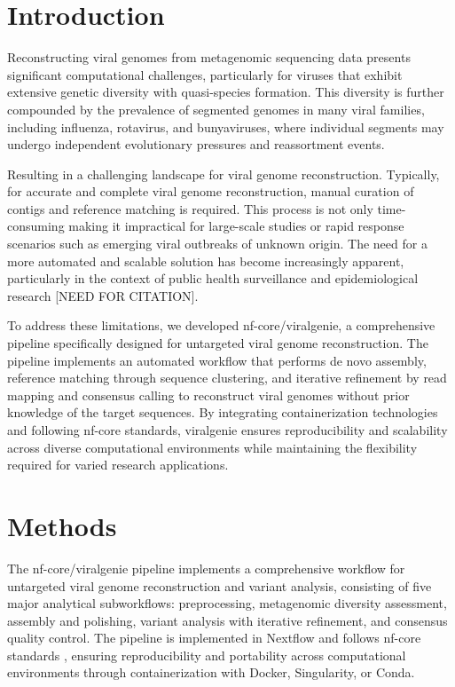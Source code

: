 \documentclass[unnumsec,webpdf,contemporary,large]{oup-authoring-template}%
\theoremstyle{thmstyleone}%
\theoremstyle{thmstyletwo}%
\theoremstyle{thmstylethree}%
\begin{document}
\section{Introduction}\label{sec1}

Reconstructing viral genomes from metagenomic sequencing data presents significant computational challenges, particularly for viruses that exhibit extensive genetic diversity with quasi-species formation. This diversity is further compounded by the prevalence of segmented genomes in many viral families, including influenza, rotavirus, and bunyaviruses, where individual segments may undergo independent evolutionary pressures and reassortment events.

Resulting in a challenging landscape for viral genome reconstruction. Typically, for accurate and complete viral genome reconstruction, manual curation of contigs and reference matching is required. This process is not only time-consuming making it impractical for large-scale studies or rapid response scenarios such as emerging viral outbreaks of unknown origin. The need for a more automated and scalable solution has become increasingly apparent, particularly in the context of public health surveillance and epidemiological research [NEED FOR CITATION].

To address these limitations, we developed nf-core/viralgenie, a comprehensive pipeline specifically designed for untargeted viral genome reconstruction. The pipeline implements an automated workflow that performs de novo assembly, reference matching through sequence clustering, and iterative refinement by read mapping and consensus calling to reconstruct viral genomes without prior knowledge of the target sequences. By integrating containerization technologies and following nf-core standards, viralgenie ensures reproducibility and scalability across diverse computational environments while maintaining the flexibility required for varied research applications.

\section{Methods}\label{sec2}

The nf-core/viralgenie pipeline implements a comprehensive workflow for untargeted viral genome reconstruction and variant analysis, consisting of five major analytical subworkflows: preprocessing, metagenomic diversity assessment, assembly and polishing, variant analysis with iterative refinement, and consensus quality control. The pipeline is implemented in Nextflow and follows nf-core standards \cite{Krakau2022-qh}, ensuring reproducibility and portability across computational environments through containerization with Docker, Singularity, or Conda.
\end{document}
